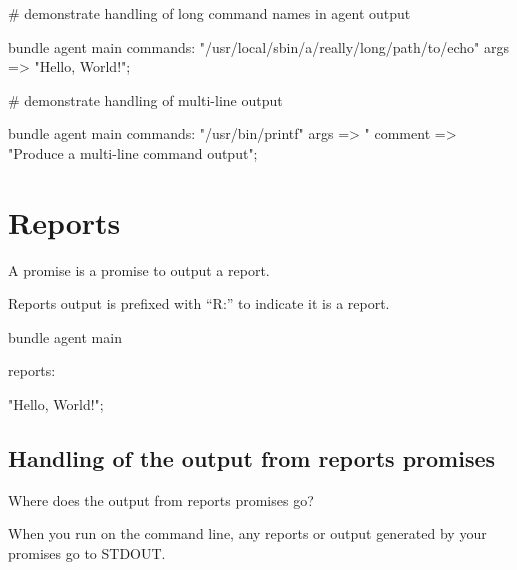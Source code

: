\begin{codelisting}
\begin{code}
# demonstrate handling of long command names in agent output

bundle agent main
{
  commands:
      "/usr/local/sbin/a/really/long/path/to/echo"
        args => "Hello, World!";
}
\end{code}
\end{codelisting}
\begin{codelisting}
\begin{code}
# demonstrate handling of multi-line output

bundle agent main
{
  commands:
      "/usr/bin/printf"
        args => "%
        comment => "Produce a multi-line command output";
}
\end{code}
\end{codelisting}





\section{Reports}

A  promise is a promise to output a report.

Reports output is prefixed with ``R:'' to indicate it is a report.

\begin{codelisting}
\begin{code}
bundle agent main
{
  reports:

      "Hello, World!";
}
\end{code}
\end{codelisting}





\subsection{Handling of the output from reports promises}

Where does the output from reports promises go?

When you run  on the command line, any reports or output
generated by your promises go to STDOUT.

